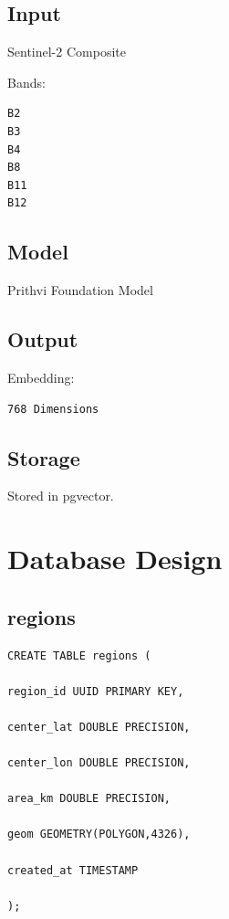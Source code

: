 \documentclass[11pt,a4paper]{article}
\begin{document}
\subsection{Input}

Sentinel-2 Composite

Bands:

\begin{verbatim}
B2
B3
B4
B8
B11
B12
\end{verbatim}

\subsection{Model}

Prithvi Foundation Model

\subsection{Output}

Embedding:

\begin{verbatim}
768 Dimensions
\end{verbatim}

\subsection{Storage}

Stored in pgvector.

\section{Database Design}

\subsection{regions}

\begin{verbatim}
CREATE TABLE regions (

region_id UUID PRIMARY KEY,

center_lat DOUBLE PRECISION,

center_lon DOUBLE PRECISION,

area_km DOUBLE PRECISION,

geom GEOMETRY(POLYGON,4326),

created_at TIMESTAMP

);
\end{verbatim}
\end{document}
